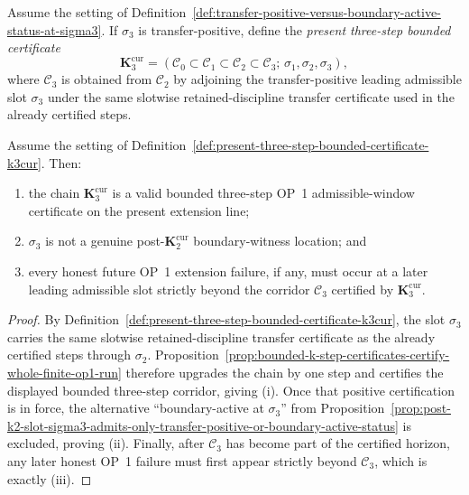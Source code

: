 \begin{definition}
\label{def:present-three-step-bounded-certificate-k3cur}
Assume the setting of Definition~\ref{def:transfer-positive-versus-boundary-active-status-at-sigma3}. If $\sigma_3$ is transfer-positive, define the \emph{present three-step bounded certificate}
\[
  \mathbf K_3^{\mathrm{cur}}=(\mathcal C_0\subset \mathcal C_1\subset \mathcal C_2\subset \mathcal C_3;\,\sigma_1,\sigma_2,\sigma_3),
\]
where $\mathcal C_3$ is obtained from $\mathcal C_2$ by adjoining the transfer-positive leading admissible slot $\sigma_3$ under the same slotwise retained-discipline transfer certificate used in the already certified steps.
\end{definition}

\begin{proposition}
\label{prop:transfer-positive-status-at-sigma3-certifies-k3cur-and-discharges-local-boundary-channel}
Assume the setting of Definition~\ref{def:present-three-step-bounded-certificate-k3cur}. Then:
\begin{enumerate}[label=(\roman*)]
  \item the chain $\mathbf K_3^{\mathrm{cur}}$ is a valid bounded three-step OP~1 admissible-window certificate on the present extension line;
  \item $\sigma_3$ is not a genuine post-$\mathbf K_2^{\mathrm{cur}}$ boundary-witness location; and
  \item every honest future OP~1 extension failure, if any, must occur at a later leading admissible slot strictly beyond the corridor $\mathcal C_3$ certified by $\mathbf K_3^{\mathrm{cur}}$.
\end{enumerate}
\end{proposition}

\begin{proof}
By Definition~\ref{def:present-three-step-bounded-certificate-k3cur}, the slot $\sigma_3$ carries the same slotwise retained-discipline transfer certificate as the already certified steps through $\sigma_2$. Proposition~\ref{prop:bounded-k-step-certificates-certify-whole-finite-op1-run} therefore upgrades the chain by one step and certifies the displayed bounded three-step corridor, giving (i). Once that positive certification is in force, the alternative ``boundary-active at $\sigma_3$'' from Proposition~\ref{prop:post-k2-slot-sigma3-admits-only-transfer-positive-or-boundary-active-status} is excluded, proving (ii). Finally, after $\mathcal C_3$ has become part of the certified horizon, any later honest OP~1 failure must first appear strictly beyond $\mathcal C_3$, which is exactly (iii).
\end{proof}

